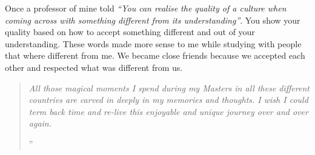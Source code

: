 \documentclass[10pt,a4paper]{article} %
\begin{document}
\begin{multicols}{3}
Once a professor of mine told \textit{``You can realise the 
	quality of a culture when coming across with something different 
	from its understanding''}. 
You show your quality based on how to accept something different and 
out of your understanding.
These words made more sense to me while studying with people that where different 
from me. 
We became close friends because we accepted each other and respected what was 
different from us. 
 




\begin{quotation} %

\noindent\normalsize\textit{All those magical moments I spend during my 
	Masters in all these different countries are carved in deeply in my 
	memories and thoughts. 
	I wish I could term back time and re-live this enjoyable and unique 
	journey over and over again.
}

\hfill{\Huge''}

\end{quotation}


\end{multicols}


\end{document}
